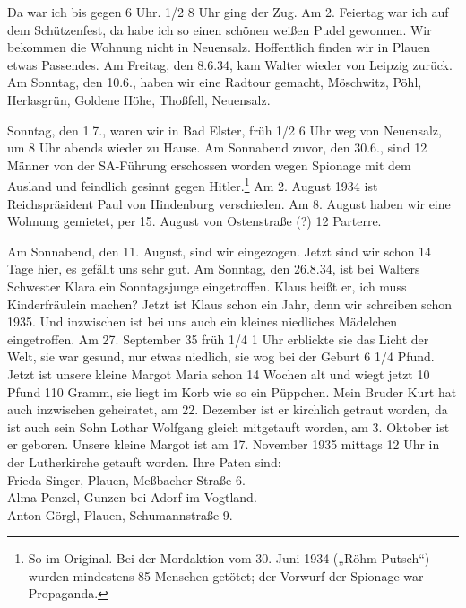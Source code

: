 \documentclass[a5paper,11pt,openany]{book}
\newcommand{\seite}[1]{\leavevmode\marginpar{\footnotesize\itshape\raggedright #1}\ignorespaces}
\begin{document}
\seite{36}
Da war ich bis gegen 6 Uhr.
1/2 8 Uhr ging der Zug.
Am 2. Feiertag war ich auf dem Schützenfest, da habe ich so einen schönen weißen Pudel gewonnen.
Wir bekommen die Wohnung nicht in Neuensalz.
Hoffentlich finden wir in Plauen etwas Passendes.
Am Freitag, den 8.6.34, kam Walter wieder von Leipzig zurück.
Am Sonntag, den 10.6., haben wir eine Radtour gemacht, Möschwitz, Pöhl, Herlasgrün, Goldene Höhe, Thoßfell, Neuensalz.

\seite{37}
Sonntag, den 1.7., waren wir in Bad Elster, früh 1/2 6 Uhr weg von Neuensalz, um 8 Uhr abends wieder zu Hause.
Am Sonnabend zuvor, den 30.6., sind 12 Männer von der SA-Führung erschossen worden
  wegen Spionage mit dem Ausland und feindlich gesinnt gegen Hitler.\footnote{So im Original. Bei der Mordaktion vom 30. Juni 1934 („Röhm-Putsch“) wurden mindestens 85 Menschen getötet; der Vorwurf der Spionage war Propaganda.}
Am 2. August 1934 ist Reichspräsident Paul von Hindenburg verschieden.
Am 8. August haben wir eine Wohnung gemietet, per 15. August von Ostenstraße (?) 12 Parterre.

\seite{38}
Am Sonnabend, den 11. August, sind wir eingezogen.
Jetzt sind wir schon 14 Tage hier, es gefällt uns sehr gut.
Am Sonntag, den 26.8.34, ist bei Walters Schwester Klara ein Sonntagsjunge eingetroffen.
Klaus heißt er, ich muss Kinderfräulein machen?
Jetzt ist Klaus schon ein Jahr, denn wir schreiben schon 1935.
Und inzwischen ist bei uns auch ein kleines niedliches Mädelchen eingetroffen.
Am 27. September 35 früh 1/4 1 Uhr erblickte sie das Licht der Welt,
  sie war gesund, nur etwas niedlich, sie wog bei der Geburt 6 1/4 Pfund.
Jetzt ist
\seite{39}
unsere kleine Margot Maria schon 14 Wochen alt und wiegt jetzt 10 Pfund 110 Gramm, sie liegt im Korb wie so ein Püppchen.
Mein Bruder Kurt hat auch inzwischen geheiratet, am 22. Dezember ist er kirchlich getraut worden,
  da ist auch sein Sohn Lothar Wolfgang gleich mitgetauft worden, am 3. Oktober ist er geboren.
Unsere kleine Margot ist am 17. November 1935 mittags 12 Uhr in der Lutherkirche getauft worden.
Ihre Paten sind:\\
Frieda Singer, Plauen, Meßbacher Straße 6.\\
Alma Penzel, Gunzen bei Adorf im Vogtland.\\
Anton Görgl, Plauen, Schumannstraße 9.
\end{document}
